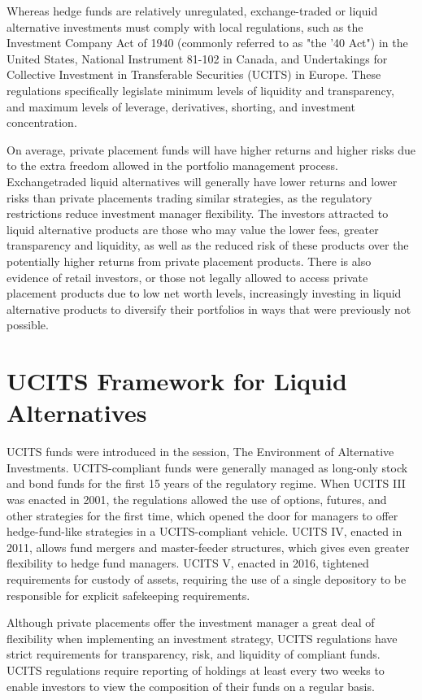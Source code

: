 \documentclass[11pt]{article}
\begin{document}
Whereas hedge funds are relatively unregulated, exchange-traded or liquid alternative investments must comply with local regulations, such as the Investment Company Act of 1940 (commonly referred to as "the '40 Act") in the United States, National Instrument 81-102 in Canada, and Undertakings for Collective Investment in Transferable Securities (UCITS) in Europe. These regulations specifically legislate minimum levels of liquidity and transparency, and maximum levels of leverage, derivatives, shorting, and investment concentration.

On average, private placement funds will have higher returns and higher risks due to the extra freedom allowed in the portfolio management process. Exchangetraded liquid alternatives will generally have lower returns and lower risks than private placements trading similar strategies, as the regulatory restrictions reduce investment manager flexibility. The investors attracted to liquid alternative products are those who may value the lower fees, greater transparency and liquidity, as well as the reduced risk of these products over the potentially higher returns from private placement products. There is also evidence of retail investors, or those not legally allowed to access private placement products due to low net worth levels, increasingly investing in liquid alternative products to diversify their portfolios in ways that were previously not possible.

\section*{UCITS Framework for Liquid Alternatives}
UCITS funds were introduced in the session, The Environment of Alternative Investments. UCITS-compliant funds were generally managed as long-only stock and bond funds for the first 15 years of the regulatory regime. When UCITS III was enacted in 2001, the regulations allowed the use of options, futures, and other strategies for the first time, which opened the door for managers to offer hedge-fund-like strategies in a UCITS-compliant vehicle. UCITS IV, enacted in 2011, allows fund mergers and master-feeder structures, which gives even greater flexibility to hedge fund managers. UCITS V, enacted in 2016, tightened requirements for custody of assets, requiring the use of a single depository to be responsible for explicit safekeeping requirements.

Although private placements offer the investment manager a great deal of flexibility when implementing an investment strategy, UCITS regulations have strict requirements for transparency, risk, and liquidity of compliant funds. UCITS regulations require reporting of holdings at least every two weeks to enable investors to view the composition of their funds on a regular basis.
\end{document}
